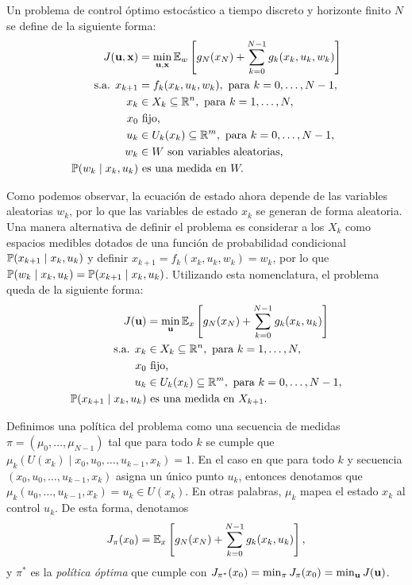 Un problema de control óptimo estocástico a tiempo discreto y horizonte finito \(N\) se define de la siguiente forma:
\begin{align*}
	J(\mathbf{u}, \mathbf{x})				&= \min_{\mathbf{u}, \mathbf{x}} \mathbb{E}_{w}\left[g_{N}(x_{N}) + \sum_{k=0}^{N-1} g_{k}(x_{k}, u_{k}, w_{k})\right] \\
	\text{s.a. } x_{k+1}			&= f_{k}(x_{k}, u_{k}, w_{k}), \text{ para } k = 0, \dotsc, N-1, \\
	x_{k}							&\in X_{k} \subseteq \mathbb{R}^{n}, \text{ para } k = 1, \dotsc, N,\\
	x_{0}							&\text{ fijo,} \\
	u_{k}							&\in U_{k}(x_{k}) \subseteq \mathbb{R}^{m}, \text{ para } k = 0, \dotsc, N-1, \\
	w_{k}							&\in W \text{ son variables aleatorias,} \\
	\mathbb{P}(w_{k} \mid x_{k}, u_{k})	&\text{ es una medida en }W.
\end{align*}

Como podemos observar, la ecuación de estado ahora depende de las variables aleatorias \(w_{k}\), por lo que las variables de estado \(x_{k}\) se generan de forma aleatoria. Una manera alternativa de definir el problema es considerar a los \(X_{k}\) como espacios medibles dotados de una función de probabilidad condicional \(\mathbb{P}(x_{k+1} \mid x_{k}, u_{k})\) y definir \(x_{k+1} = f_{k}(x_{k}, u_{k}, w_{k}) = w_{k}\), por lo que \(\mathbb{P}(w_{k} \mid x_{k}, u_{k}) = \mathbb{P}(x_{k+1} \mid x_{k}, u_{k})\). Utilizando esta nomenclatura, el problema queda de la siguiente forma:
\begin{align*}
	J(\mathbf{u})							&= \min_{\mathbf{u}} \mathbb{E}_{x} \left[g_{N}(x_{N}) + \sum_{k=0}^{N-1} g_{k}(x_{k}, u_{k})\right] \\
	\text{s.a. } x_{k}					&\in X_{k} \subseteq \mathbb{R}^{n}, \text{ para } k = 1, \dotsc,N,\\
	x_{0}								&\text{ fijo,} \\
	u_{k}								&\in U_{k}(x_{k}) \subseteq \mathbb{R}^{m}, \text{ para } k = 0, \dotsc, N-1,\\
	\mathbb{P}(x_{k+1} \mid x_{k}, u_{k})	&\text{ es una medida en } X_{k+1}.
\end{align*}

Definimos una política del problema como una secuencia de medidas \(\pi = (\mu_{0}, \dotsc, \mu_{N-1})\) tal que para todo \(k\) se cumple que \(\mu_{k}(U(x_{k}) \mid x_{0}, u_{0}, \dotsc, u_{k-1}, x_{k}) = 1.\) En el caso en que para todo \(k\) y secuencia \((x_{0}, u_{0}, \dotsc, u_{k-1}, x_{k})\) asigna un único punto \(u_{k}\), entonces denotamos que \(\mu_{k}(u_{0}, \dotsc, u_{k-1}, x_{k}) = u_{k} \in U(x_{k})\). En otras palabras, \(\mu_{k}\) mapea el estado \(x_{k}\) al control \(u_{k}\). De esta forma, denotamos
\begin{equation*}
	J_{\pi}(x_{0}) = \mathbb{E}_{x}\left[g_{N}(x_{N}) + \sum_{k=0}^{N-1} g_{k}(x_{k}, u_{k})\right],
\end{equation*}
y \(\pi^{\ast}\) es la \emph{política óptima} que cumple con \(J_{\pi ^{\ast}}(x_{0})=\min_{\pi }J_{\pi }(x_{0})=\min_{\mathbf{u}}J(\mathbf{u})\).

